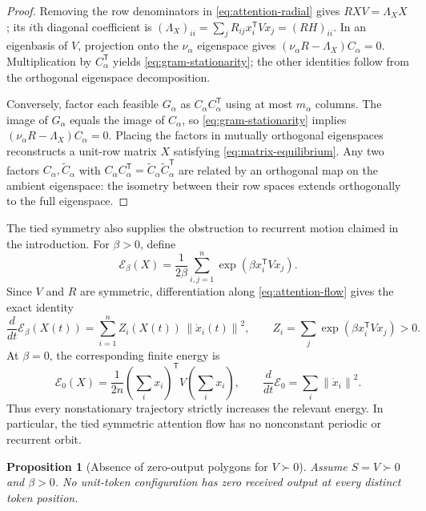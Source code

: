 \documentclass[11pt,a4paper]{article}
\newtheorem{proposition}[theorem]{Proposition}
\theoremstyle{definition}
\newcommand{\T}{\mathsf T}
\newcommand{\norm}[1]{\left\lVert #1\right\rVert}
\begin{document}
\begin{proof}
Removing the row denominators in \eqref{eq:attention-radial} gives
$RXV=\Lambda_X X$; its $i$th diagonal coefficient is
$(\Lambda_X)_{ii}=\sum_jR_{ij}x_i^{\T}Vx_j=(RH)_{ii}$.  In an eigenbasis of $V$, projection
onto the $\nu_\alpha$ eigenspace gives
$(\nu_\alpha R-\Lambda_X)C_\alpha=0$.  Multiplication by $C_\alpha^{\T}$ yields
\eqref{eq:gram-stationarity}; the other identities follow from the orthogonal
eigenspace decomposition.

Conversely, factor each feasible $G_\alpha$ as
$C_\alpha C_\alpha^{\T}$ using at most $m_\alpha$ columns.  The image of
$G_\alpha$ equals the image of $C_\alpha$, so
\eqref{eq:gram-stationarity} implies
$(\nu_\alpha R-\Lambda_X)C_\alpha=0$.  Placing the factors in mutually orthogonal
eigenspaces reconstructs a unit-row matrix $X$ satisfying
\eqref{eq:matrix-equilibrium}.  Any two factors $C_\alpha,\widetilde C_\alpha$
with $C_\alpha C_\alpha^{\T}=\widetilde C_\alpha\widetilde C_\alpha^{\T}$ are related
by an orthogonal map on the ambient eigenspace: the isometry between their row spaces
extends orthogonally to the full eigenspace.
\end{proof}

The tied symmetry also supplies the obstruction to recurrent motion claimed in the
introduction.  For $\beta>0$, define
\begin{equation}
 \mathcal E_\beta(X)=\frac{1}{2\beta}
 \sum_{i,j=1}^n \exp\!\left(\beta x_i^{\T}Vx_j\right).
 \label{eq:tied-energy}
\end{equation}
Since $V$ and $R$ are symmetric, differentiation along
\eqref{eq:attention-flow} gives the exact identity
\begin{equation}
 \frac{d}{dt}\mathcal E_\beta(X(t))
 =\sum_{i=1}^n Z_i(X(t))\,\norm{\dot x_i(t)}^2,
 \qquad Z_i=\sum_j\exp(\beta x_i^{\T}Vx_j)>0.
 \label{eq:tied-energy-identity}
\end{equation}
At $\beta=0$, the corresponding finite energy is
\begin{equation}
 \mathcal E_0(X)=\frac{1}{2n}
 \left(\sum_i x_i\right)^{\T}V\left(\sum_i x_i\right),
 \qquad
 \frac{d}{dt}\mathcal E_0=\sum_i\norm{\dot x_i}^2.
 \label{eq:uniform-energy}
\end{equation}
Thus every nonstationary trajectory strictly increases the relevant energy.  In
particular, the tied symmetric attention flow has no nonconstant periodic or
recurrent orbit.

\begin{proposition}[Absence of zero-output polygons for $V\succ0$]
\label{prop:no-zero-positive}
Assume $S=V\succ0$ and $\beta>0$.  No unit-token configuration has zero received
output at every distinct token position.
\end{proposition}
\end{document}
